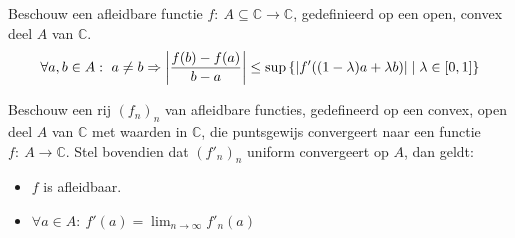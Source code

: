 \documentclass[main.tex]{subfiles}
\begin{document}
\begin{bpr}
  Beschouw een afleidbare functie $f:\ A \subseteq \mathbb{C} \rightarrow \mathbb{C}$, gedefinieerd op een open, convex deel $A$ van $\mathbb{C}$.
  \[ \forall a,b \in A:\ a \neq b \Rightarrow \left|\frac{f(b)-f(a)}{b-a}\right| \le \sup\left\{ \left|f'((1-\lambda)a+\lambda b)\right| \mid \lambda \in \interval{0}{1} \right\} \]
\end{bpr}


\begin{st}
  Beschouw een rij $(f_{n})_{n}$ van afleidbare functies, gedefineerd op een convex, open deel $A$ van $\mathbb{C}$ met waarden in $\mathbb{C}$, die puntsgewijs convergeert naar een functie $f:\ A \rightarrow \mathbb{C}$.
  Stel bovendien dat $(f'_{n})_{n}$ uniform convergeert op $A$, dan geldt:
  \begin{itemize}
  \item $f$ is afleidbaar.
  \item $\forall a\in A:\ f'(a) = \lim_{n \rightarrow \infty}f'_{n}(a)$
  \end{itemize}
\end{st}
\end{document}
